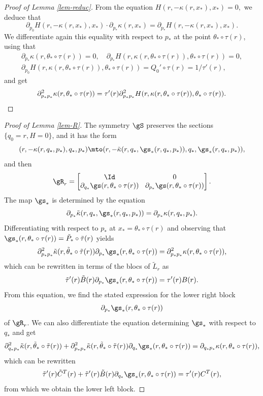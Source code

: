 \begin{proof}[Proof of Lemma \ref{lem-reduc}]
From the equation
$
H(r,-\kappa(r, x_*), x_*)=0,
$
we deduce that
\[
\partial_{p_0}H(r,-\kappa(r,x_*), x_*) \cdot\partial_{p_*}\kappa(r,x_*)=\partial_{p_*} H(r, -\kappa(r, x_*), x_*).
\]
We differentiate again this equality with respect to $p_*$ at the point $\theta_*\circ \tau (r)$, using that
\begin{gather*}
\partial_{p_*}\kappa (r, \theta_*\circ \tau(r) )=0, \quad
\partial_{p_*}H(r, \kappa (r,\theta_*\circ \tau(r )),\theta_*\circ \tau(r))=0,\\
\partial_{p_0}H(r, \kappa (r,\theta_*\circ \tau(r )),\theta_*\circ \tau(r))= Q_0'\circ \tau (r)=1/\tau'(r),
\end{gather*}
and get
\[
\partial^2_{p_*p_*}\kappa(r,\theta_*\circ \tau(r) )
=\tau'(r)\partial^2_{p_*p_*}H(r, \kappa (r,\theta_*\circ \tau(r )),\theta_*\circ \tau(r)).\qedhere
\]
\end{proof}

\begin{proof}[Proof of Lemma \ref{lem-R}]
The symmetry $\gS$ preserves the sections $\{q_0= r, H=0\}$, and it has the form
\[
(r, -\kappa(r,q_*,p_*),q_*,p_*)\mto (r, -\tilde \kappa(r,q_*,\gs_*(r,q_*,p_*)),q_*,\gs_*(r,q_*,p_*)),
\]
and then
\[\arraycolsep4.5pt
\gR_r=
\begin{bmatrix}
\Id&0\\ \partial_{q_*}\gs(r, \theta_*\circ \tau(r))& \partial_{p_*}\gs(r, \theta_*\circ \tau(r))
\end{bmatrix}.
\]
The map $\gs_*$ is determined by the equation
\[
\partial_{p_*}\tilde \kappa(r,q_*, \gs_*(r,q_*,p_*))=\partial_{p_*}\kappa(r,q_*, p_*).
\]
Differentiating with respect to $p_*$ at $x_*=\theta_*\circ \tau(r)$
and observing that
$\gs_*(r,\theta_*\circ \tau (r))= \tilde P_*\circ \tilde \tau(r)$ yields
\[
\partial^2_{p_*p_*}\tilde \kappa(r, \tilde \theta_*\circ \tilde \tau (r))
\partial_{p_*}\gs_*(r, \theta_*\circ \tau (r))
=\partial^2_{p_*p_*} \kappa(r, \theta_*\circ \tau (r)),
\]
which can be rewritten in terms of the blocs of $\tilde L_r$ as
\[
\tilde \tau'(r) \tilde B(r) \partial_{p_*}\gs_*(r, \theta_*\circ \tau (r))
=\tau'(r) B(r).
\]
From this equation, we find the stated expression for the lower right block
\[
\partial_{p_*}\gs_*(r,\theta_*\circ \tau (r))
\]
of $\gR_r$.
We can also differentiate the equation determining $\gs_*$ with respect to $q_*$ and get
\[
\partial^2_{q_*p_*}\tilde \kappa(r, \tilde \theta_*\circ \tilde \tau (r))+
\partial^2_{p_*p_*}\tilde \kappa(r, \tilde \theta_*\circ \tilde \tau (r))
\partial_{q_*}\gs_*(r, \theta_*\circ \tau (r))=
\partial_{q_*p_*}\kappa (r, \theta_*\circ \tau(r)),
\]
which can be rewritten
\[
\tilde \tau'(r)\tilde C^T(r)+\tilde \tau'(r)\tilde B(r)\partial_{q_*}\gs_*(r, \theta_*\circ \tau (r))=\tau'(r)C^T(r),
\]
from which we obtain the lower left block.
\end{proof}


